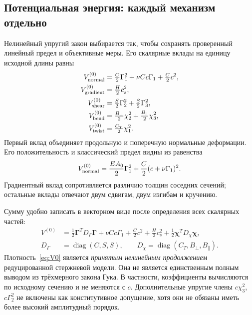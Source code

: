 \documentclass[11pt,a4paper]{article}
\newcommand{\Gam}{\boldsymbol\Gamma}
\newcommand{\Chi}{\boldsymbol\chi}
\begin{document}
\subsection{Потенциальная энергия: каждый механизм отдельно}
Нелинейный упругий закон выбирается так, чтобы сохранять проверенный линейный предел и объективные меры. Его скалярные вклады на единицу исходной длины равны
\[
\begin{aligned}
V_{\rm normal}^{(0)}&=\tfrac C2\Gamma_1^2+\nu Cc\Gamma_1+\tfrac C2c^2,\\
V_{\rm gradient}^{(0)}&=\tfrac H2c_s^2,\\
V_{\rm shear}^{(0)}&=\tfrac S2\Gamma_2^2+\tfrac S2\Gamma_3^2,\\
V_{\rm bend}^{(0)}&=\tfrac{B_\perp}{2}\chi_2^2+\tfrac{B_\parallel}{2}\chi_3^2,\\
V_{\rm twist}^{(0)}&=\tfrac{C_T}{2}\chi_1^2.
\end{aligned}
\]
Первый вклад объединяет продольную и поперечную нормальные деформации. Его положительность и классический предел видны из равенства
\[
V_{\rm normal}^{(0)}=\frac{EA_0}{2}\Gamma_1^2
+\frac C2(c+\nu\Gamma_1)^2.
\]
Градиентный вклад сопротивляется различию толщин соседних сечений; остальные вклады отвечают двум сдвигам, двум изгибам и кручению.

Сумму удобно записать в векторном виде после определения всех скалярных частей:
\begin{equation}
\begin{aligned}
V^{(0)}&=\tfrac12\Gam^TD_\Gamma\Gam+\nu Cc\Gamma_1
+\tfrac C2c^2+\tfrac H2c_s^2+\tfrac12\Chi^TD_\chi\Chi,\\
D_\Gamma&=\operatorname{diag}(C,S,S),\qquad
D_\chi=\operatorname{diag}(C_T,B_\perp,B_\parallel).
\end{aligned}
\label{eq:V0}
\end{equation}
Плотность~\eqref{eq:V0} является \emph{принятым нелинейным продолжением} редуцированной стержневой модели. Она не является единственным полным выводом из трёхмерного закона Гука. В частности, коэффициенты вычисляются по исходному сечению и не меняются с $c$. Дополнительные упругие члены $c\chi_3^2$, $c\Gamma_2^2$ не включены как конститутивное допущение, хотя они не обязаны иметь более высокий амплитудный порядок.
\end{document}
